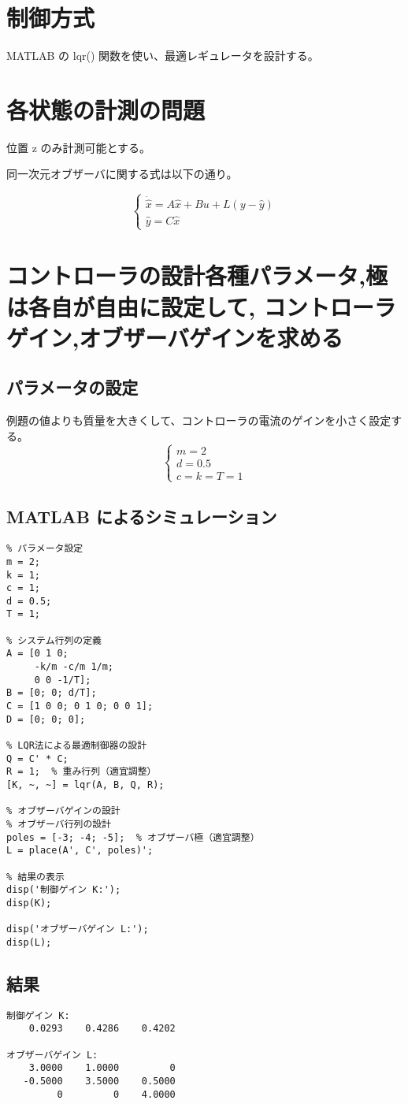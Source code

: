 \documentclass{jsarticle}
\begin{document}
\section{制御方式}

MATLAB の lqr() 関数を使い、最適レギュレータを設計する。


\section{各状態の計測の問題}
位置 z のみ計測可能とする。

同一次元オブザーバに関する式は以下の通り。

\[
     \begin{cases}
          \dot{\hat{x}} = A\hat{x} + Bu + L(y - \hat{y}) \\
          \hat{y} = C\hat{x}
     \end{cases}
\]


\section{コントローラの設計各種パラメータ,極は各自が自由に設定して, コントローラゲイン,オブザーバゲインを求める}
\subsection{パラメータの設定}
例題の値よりも質量を大きくして、コントローラの電流のゲインを小さく設定する。
\[\begin{cases}
m = 2 \\
d = 0.5 \\
c = k = T = 1
\end{cases}\]

\subsection{MATLAB によるシミュレーション}
\begin{verbatim}
% パラメータ設定
m = 2;
k = 1;
c = 1;
d = 0.5;
T = 1;

% システム行列の定義
A = [0 1 0; 
     -k/m -c/m 1/m; 
     0 0 -1/T];
B = [0; 0; d/T];
C = [1 0 0; 0 1 0; 0 0 1];
D = [0; 0; 0];

% LQR法による最適制御器の設計
Q = C' * C;
R = 1;  % 重み行列（適宜調整）
[K, ~, ~] = lqr(A, B, Q, R);

% オブザーバゲインの設計
% オブザーバ行列の設計
poles = [-3; -4; -5];  % オブザーバ極（適宜調整）
L = place(A', C', poles)';

% 結果の表示
disp('制御ゲイン K:');
disp(K);

disp('オブザーバゲイン L:');
disp(L);
\end{verbatim}

\subsection{結果}
\begin{verbatim}
制御ゲイン K:
    0.0293    0.4286    0.4202

オブザーバゲイン L:
    3.0000    1.0000         0
   -0.5000    3.5000    0.5000
         0         0    4.0000
\end{verbatim}
\end{document}
